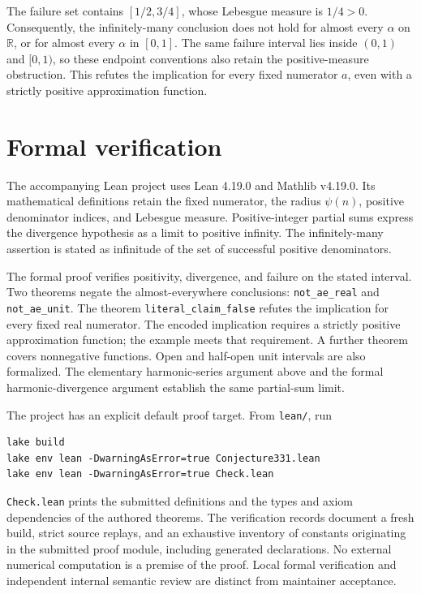 \documentclass[11pt]{article}
\begin{document}
The failure set contains $[1/2,3/4]$, whose Lebesgue measure is $1/4>0$.
Consequently, the infinitely-many conclusion does not hold for almost every
$\alpha$ on $\mathbb R$, or for almost every $\alpha$ in $[0,1]$. The same failure interval lies inside $(0,1)$ and $[0,1)$, so these
endpoint conventions also retain the positive-measure obstruction. This refutes the implication for every fixed numerator $a$,
even with a strictly positive approximation function.

\section{Formal verification}
The accompanying Lean project uses Lean 4.19.0 and Mathlib v4.19.0.
Its mathematical definitions retain the fixed numerator, the radius
$\psi(n)$, positive denominator indices, and Lebesgue measure.
Positive-integer partial sums express the divergence hypothesis as a limit
to positive infinity. The infinitely-many assertion is stated as infinitude
of the set of successful positive denominators.

The formal proof verifies positivity, divergence, and failure on the stated
interval. Two theorems negate the almost-everywhere conclusions:
\texttt{not\_ae\_real} and \texttt{not\_ae\_unit}.
The theorem \texttt{literal\_claim\_false} refutes the implication for
every fixed real numerator. The encoded implication requires a strictly
positive approximation function; the example meets that requirement.
A further theorem covers nonnegative functions. Open and half-open unit
intervals are also formalized.
The elementary harmonic-series argument above and the formal
harmonic-divergence argument establish the same partial-sum limit.

The project has an explicit default proof target. From \texttt{lean/}, run
\begin{verbatim}
lake build
lake env lean -DwarningAsError=true Conjecture331.lean
lake env lean -DwarningAsError=true Check.lean
\end{verbatim}
\texttt{Check.lean} prints the submitted definitions and the types and axiom
dependencies of the authored theorems. The verification records document a
fresh build, strict source replays, and an exhaustive inventory of constants
originating in the submitted proof module, including generated declarations.
No external numerical computation is a premise of the proof. Local formal
verification and independent internal semantic review are distinct from
maintainer acceptance.
\end{document}
